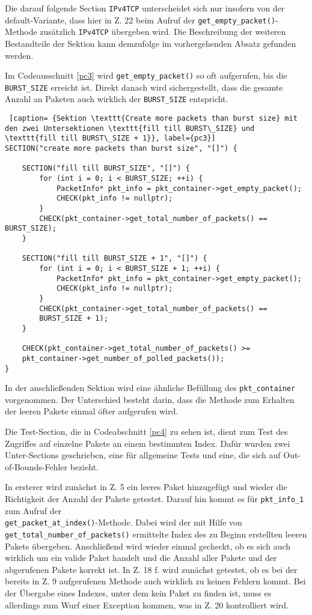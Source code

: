 \documentclass[../review_3.tex]{subfiles}
\begin{document}
Die darauf folgende Section \texttt{IPv4TCP} unterscheidet sich nur insofern von der default-Variante, dass hier in Z. 22 beim Aufruf der \texttt{get\_empty\_packet()}-Methode zusätzlich \texttt{IPv4TCP} übergeben wird. Die Beschreibung der weiteren Bestandteile der Sektion kann demzufolge im vorhergehenden Absatz gefunden werden.

Im Codeausschnitt \ref{pc3} wird \texttt{get\_empty\_packet()} so oft aufgerufen, bis die \texttt{BURST\_SIZE} erreicht ist. Direkt danach wird sichergestellt, dass die gesamte Anzahl an Paketen auch wirklich der \texttt{BURST\_SIZE} entspricht.

\begin{lstlisting} [caption= {Sektion \texttt{Create more packets than burst size} mit den zwei Untersektionen \texttt{fill till BURST\_SIZE} und \texttt{fill till BURST\_SIZE + 1}}, label={pc3}]
SECTION("create more packets than burst size", "[]") {
    
    SECTION("fill till BURST_SIZE", "[]") {
        for (int i = 0; i < BURST_SIZE; ++i) {
            PacketInfo* pkt_info = pkt_container->get_empty_packet();
            CHECK(pkt_info != nullptr);
        }
        CHECK(pkt_container->get_total_number_of_packets() == BURST_SIZE);
    }
    
    SECTION("fill till BURST_SIZE + 1", "[]") {
        for (int i = 0; i < BURST_SIZE + 1; ++i) {
            PacketInfo* pkt_info = pkt_container->get_empty_packet();
            CHECK(pkt_info != nullptr);
        }
        CHECK(pkt_container->get_total_number_of_packets() ==
        BURST_SIZE + 1);
    }
    
    CHECK(pkt_container->get_total_number_of_packets() >=
    pkt_container->get_number_of_polled_packets());
}\end{lstlisting}

In der anschließenden Sektion wird eine ähnliche Befüllung des \texttt{pkt\_container} vorgenommen. Der Unterschied besteht darin, dass die Methode zum Erhalten der leeren Pakete einmal öfter aufgerufen wird.

Die Test-Section, die in Codeabschnitt \ref{pc4} zu sehen ist, dient zum Test des Zugriffes auf einzelne Pakete an einem bestimmten Index. Dafür wurden zwei Unter-Sections geschrieben, eine für allgemeine Tests und eine, die sich auf Out-of-Bounds-Fehler bezieht.

In ersterer wird zunächst in Z. 5 ein leeres Paket hinzugefügt und wieder die Richtigkeit der Anzahl der Pakete getestet. Darauf hin kommt es für \texttt{pkt\_info\_1} zum Aufruf der\\ \texttt{get\_packet\_at\_index()}-Methode. Dabei wird der mit Hilfe von\\ \texttt{get\_total\_number\_of\_packets()} ermittelte Index des zu Beginn erstellten leeren Pakets übergeben. Anschließend wird wieder einmal gecheckt, ob es sich auch wirklich um ein valide Paket handelt und die Anzahl aller Pakete und der abgerufenen Pakete korrekt ist. In Z. 18 f. wird zunächst getestet, ob es bei der bereits in Z. 9 aufgerufenen Methode auch wirklich zu keinen Fehlern kommt. Bei der Übergabe eines Indexes, unter dem kein Paket zu finden ist, muss es allerdings zum Wurf einer Exception kommen, was in Z. 20 kontrolliert wird.
\end{document}
